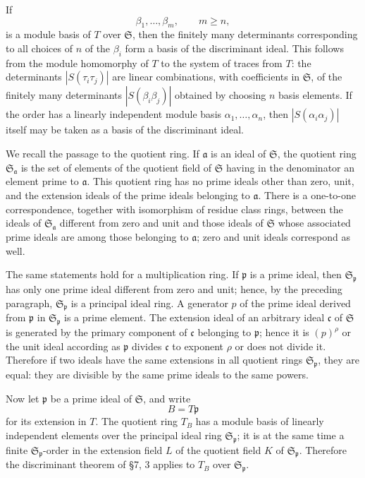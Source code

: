 \documentclass[
  12pt,
]{article}
\begin{document}
If \[
  \beta_1,
\ldots,
\beta_m,
  \qquad m\ge n,
\] is a module basis of \(T\) over \(\mathfrak S\), then the finitely
many determinants corresponding to all choices of \(n\) of the
\(\beta_i\) form a basis of the discriminant ideal. This follows from
the module homomorphy of \(T\) to the system of traces from \(T\): the
determinants \(|S(\tau_i\tau_j)|\) are linear combinations, with
coefficients in \(\mathfrak S\), of the finitely many determinants
\(|S(\beta_i\beta_j)|\) obtained by choosing \(n\) basis elements. If
the order has a linearly independent module basis \(\alpha_1,
\ldots,
\alpha_n\), then \(|S(\alpha_i\alpha_j)|\) itself may be taken as a
basis of the discriminant ideal.

We recall the passage to the quotient ring. If \(\mathfrak a\) is an
ideal of \(\mathfrak S\), the quotient ring
\(\mathfrak S_{\mathfrak a}\) is the set of elements of the quotient
field of \(\mathfrak S\) having in the denominator an element prime to
\(\mathfrak a\). This quotient ring has no prime ideals other than zero,
unit, and the extension ideals of the prime ideals belonging to
\(\mathfrak a\). There is a one-to-one correspondence, together with
isomorphism of residue class rings, between the ideals of
\(\mathfrak S_{\mathfrak a}\) different from zero and unit and those
ideals of \(\mathfrak S\) whose associated prime ideals are among those
belonging to \(\mathfrak a\); zero and unit ideals correspond as well.

The same statements hold for a multiplication ring. If \(\mathfrak p\)
is a prime ideal, then \(\mathfrak S_{\mathfrak p}\) has only one prime
ideal different from zero and unit; hence, by the preceding paragraph,
\(\mathfrak S_{\mathfrak p}\) is a principal ideal ring. A generator
\(p\) of the prime ideal derived from \(\mathfrak p\) in
\(\mathfrak S_{\mathfrak p}\) is a prime element. The extension ideal of
an arbitrary ideal \(\mathfrak c\) of \(\mathfrak S\) is generated by
the primary component of \(\mathfrak c\) belonging to \(\mathfrak p\);
hence it is \((p)^{\rho}\) or the unit ideal according as
\(\mathfrak p\) divides \(\mathfrak c\) to exponent \(\rho\) or does not
divide it. Therefore if two ideals have the same extensions in all
quotient rings \(\mathfrak S_{\mathfrak p}\), they are equal: they are
divisible by the same prime ideals to the same powers.

Now let \(\mathfrak p\) be a prime ideal of \(\mathfrak S\), and write
\[
  B=T\mathfrak p
\] for its extension in \(T\). The quotient ring \(T_{B}\) has a module
basis of linearly independent elements over the principal ideal ring
\(\mathfrak S_{\mathfrak p}\); it is at the same time a finite
\(\mathfrak S_{\mathfrak p}\)-order in the extension field \(L\) of the
quotient field \(K\) of \(\mathfrak S_{\mathfrak p}\). Therefore the
discriminant theorem of §7, 3 applies to \(T_B\) over
\(\mathfrak S_{\mathfrak p}\).
\end{document}
